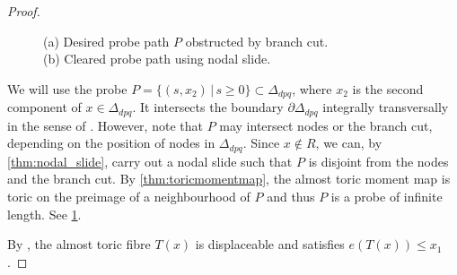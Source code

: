 \documentclass[12pt,a4paper,abstract=true,final]{scrartcl}
\begin{document}
\begin{proof}
\begin{figure}
\centering
{}
\caption{(a) Desired probe path $P$ obstructed by branch cut.\\(b) Cleared probe path using nodal slide.}
\label{fig:clear_the_probe}
\end{figure}
We will use the probe $P = \{(s,x_2) \, \vert \, s ≥ 0\} \subset \Delta_{dpq}$, where $x_2$ is the second component of $x \in \Delta_{dpq}$.
It intersects the boundary $∂ \Delta_{dpq}$ integrally transversally in the sense of \cite[Section 2.1]{mcduff2011displacing}.
However, note that $P$ may intersect nodes or the branch cut, depending on the position of nodes in $\Delta_{dpq}$.
Since $x ∉ R$, we can, by \cref{thm:nodal_slide}, carry out a nodal slide such that $P$ is disjoint from the nodes and the branch cut.
By \cref{thm:toricmomentmap}, the almost toric moment map is toric on the preimage of a neighbourhood of $P$ and thus $P$ is a probe of infinite length.
See \cref{fig:clear_the_probe}.

By \cite[Proposition 3.4]{brendel2020real}, the almost toric fibre $T(x)$ is displaceable and satisfies $e(T(x)) ≤ x_1$.
\end{proof}
\end{document}
